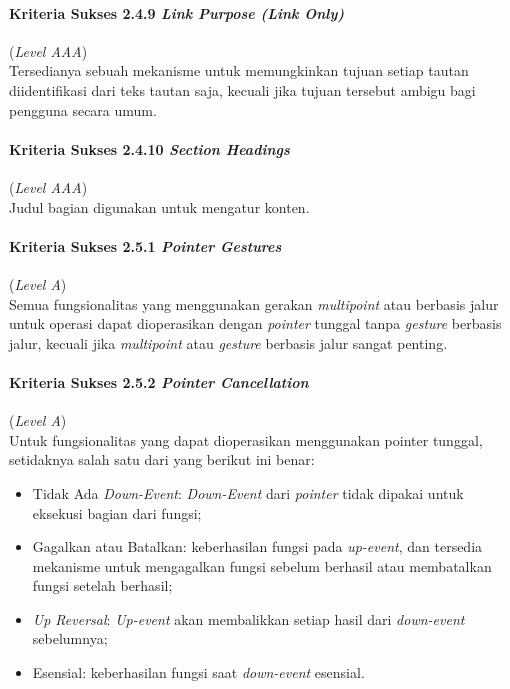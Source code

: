 \paragraph{Kriteria Sukses 2.4.9 \textit{Link Purpose (Link Only)}}
\label{subsec:kriteria_2.4.9}
(\textit{Level AAA}) \\

Tersedianya sebuah mekanisme untuk memungkinkan tujuan setiap tautan diidentifikasi dari teks tautan saja, kecuali jika tujuan tersebut ambigu bagi pengguna secara umum.

\paragraph{Kriteria Sukses 2.4.10 \textit{Section Headings}}
\label{subsec:kriteria_2.4.10}
(\textit{Level AAA}) \\

Judul bagian digunakan untuk mengatur konten.

\paragraph{Kriteria Sukses 2.5.1 \textit{Pointer Gestures}}
\label{subsec:kriteria_2.5.1}
(\textit{Level A}) \\

Semua fungsionalitas yang menggunakan gerakan \textit{multipoint} atau berbasis jalur untuk operasi dapat dioperasikan dengan \textit{pointer} tunggal tanpa \textit{gesture} berbasis jalur, kecuali jika \textit{multipoint} atau \textit{gesture} berbasis jalur sangat penting.

\paragraph{Kriteria Sukses 2.5.2 \textit{Pointer Cancellation}}
\label{subsec:kriteria_2.5.2}
(\textit{Level A}) \\

Untuk fungsionalitas yang dapat dioperasikan menggunakan pointer tunggal, setidaknya salah satu dari yang berikut ini benar:

\begin{itemize}
	\item Tidak Ada \textit{Down-Event}: \textit{Down-Event} dari \textit{pointer} tidak dipakai untuk eksekusi bagian dari fungsi;
	\item Gagalkan atau Batalkan: keberhasilan fungsi pada \textit{up-event}, dan tersedia mekanisme untuk mengagalkan fungsi sebelum berhasil atau membatalkan fungsi setelah berhasil;
	\item \textit{Up Reversal}: \textit{Up-event} akan membalikkan setiap hasil dari \textit{down-event} sebelumnya;
	\item Esensial: keberhasilan fungsi saat \textit{down-event} esensial.
\end{itemize}

